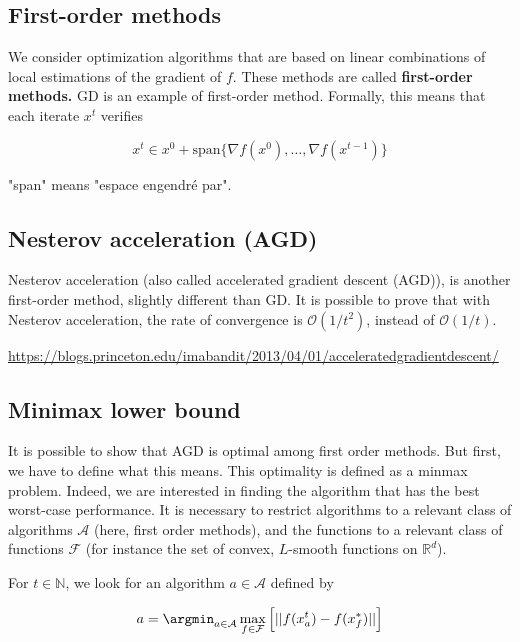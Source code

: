 \documentclass[
10pt, %
a4paper, %
oneside, %
headinclude,footinclude, %
BCOR5mm, %
]{scrartcl}
\begin{document}
\subsection{\large\color{MidnightBlue}First-order methods}

We consider optimization algorithms that are based on linear combinations of local estimations of the gradient of $f$. These methods are called \textbf{{first-order methods.}} GD is an example of first-order method. Formally, this means that each iterate $x^t$ verifies

\begin{equation}
    \label{eq:first}
    x^t\in x^0+ \text{span}\{\nabla f(x^0), \dots, \nabla f(x^{t-1})\}
\end{equation}

"span" means "espace engendré par".

\subsection{\large\color{MidnightBlue}Nesterov acceleration (AGD)}

Nesterov acceleration (also called accelerated gradient descent (AGD)), is another first-order method, slightly different than GD. It is possible to prove that with Nesterov acceleration, the rate of convergence is $ \mathcal{O}(1/t^2)$, instead of $ \mathcal{O}(1/t)$.

\url{https://blogs.princeton.edu/imabandit/2013/04/01/acceleratedgradientdescent/} 

\subsection{\large\color{MidnightBlue}Minimax lower bound}
\label{sec:minimax}

It is possible to show that AGD is optimal among first order methods. But first, we have to define what this means. This optimality is defined as a minmax problem. Indeed, we are interested in finding the algorithm that has the best worst-case performance. It is necessary to restrict algorithms to a relevant class of algorithms $ \mathcal{A} $ (here, first order methods), and the functions to a relevant class of functions $ \mathcal{F} $ (for instance the set of convex, $L$-smooth functions on $\mathbb{R}^d$). 

For $t\in \mathbb{N}$, we look for an algorithm $a\in \mathcal{A}$ defined by

\begin{equation}
    a = \argmin_{a\in \mathcal{A} } \max_{f\in \mathcal{F} } \Big[||f(x^t_a)-f(x_f^*)||\Big]
\end{equation}
\end{document}
